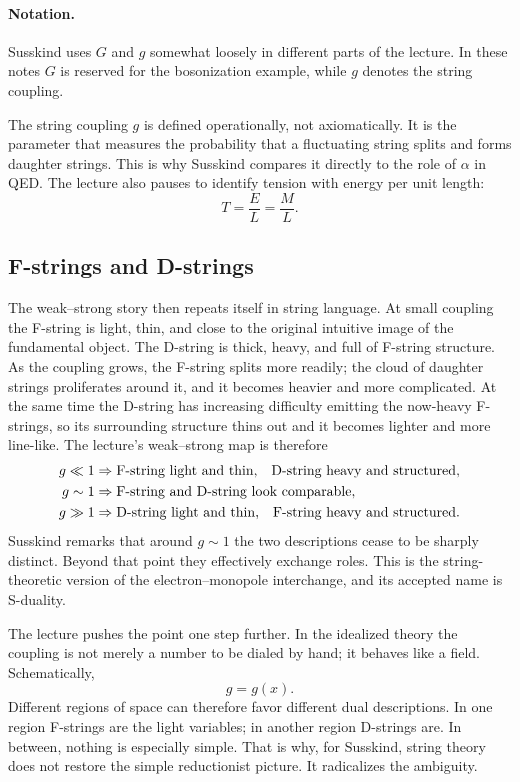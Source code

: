 \paragraph{Notation.}
Susskind uses \(G\) and \(g\) somewhat loosely in different parts of the lecture. In these notes \(G\) is reserved for the bosonization example, while \(g\) denotes the string coupling.

The string coupling \(g\) is defined operationally, not axiomatically. It is the parameter that measures the probability that a fluctuating string splits and forms daughter strings. This is why Susskind compares it directly to the role of \(\alpha\) in QED. The lecture also pauses to identify tension with energy per unit length:
\begin{equation}
T=\frac{E}{L}=\frac{M}{L}.
\end{equation}

\subsection{F-strings and D-strings}

The weak--strong story then repeats itself in string language. At small coupling the F-string is light, thin, and close to the original intuitive image of the fundamental object. The D-string is thick, heavy, and full of F-string structure. As the coupling grows, the F-string splits more readily; the cloud of daughter strings proliferates around it, and it becomes heavier and more complicated. At the same time the D-string has increasing difficulty emitting the now-heavy F-strings, so its surrounding structure thins out and it becomes lighter and more line-like. The lecture's weak--strong map is therefore
\begin{align}
g \ll 1
&\Rightarrow
\text{F-string light and thin,\quad D-string heavy and structured},\\
g \sim 1
&\Rightarrow
\text{F-string and D-string look comparable},\\
g \gg 1
&\Rightarrow
\text{D-string light and thin,\quad F-string heavy and structured}.
\end{align}
Susskind remarks that around \(g\sim 1\) the two descriptions cease to be sharply distinct. Beyond that point they effectively exchange roles. This is the string-theoretic version of the electron--monopole interchange, and its accepted name is S-duality.

The lecture pushes the point one step further. In the idealized theory the coupling is not merely a number to be dialed by hand; it behaves like a field. Schematically,
\begin{equation}
g = g(x).
\end{equation}
Different regions of space can therefore favor different dual descriptions. In one region F-strings are the light variables; in another region D-strings are. In between, nothing is especially simple. That is why, for Susskind, string theory does not restore the simple reductionist picture. It radicalizes the ambiguity.

